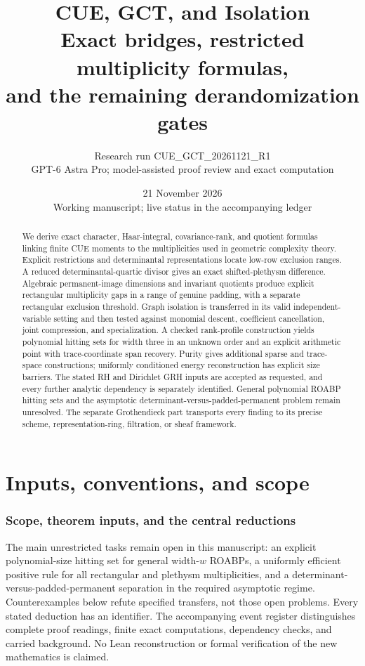 \documentclass[11pt,a4paper]{article}
\title{CUE, GCT, and Isolation\\Exact bridges, restricted multiplicity formulas,\\and the remaining derandomization gates}
\author{Research run CUE\_GCT\_20261121\_R1\\GPT-6 Astra Pro; model-assisted proof review and exact computation}
\date{21 November 2026\\Working manuscript; live status in the accompanying ledger}
\theoremstyle{definition}\newtheorem{definition}{Definition}
\begin{document}
\maketitle
\begin{abstract}
We derive exact character, Haar-integral, covariance-rank, and quotient formulas linking finite CUE moments to the multiplicities used in geometric complexity theory. Explicit restrictions and determinantal representations locate low-row exclusion ranges. A reduced determinantal-quartic divisor gives an exact shifted-plethysm difference. Algebraic permanent-image dimensions and invariant quotients produce explicit rectangular multiplicity gaps in a range of genuine padding, with a separate rectangular exclusion threshold. Graph isolation is transferred in its valid independent-variable setting and then tested against monomial descent, coefficient cancellation, joint compression, and specialization. A checked rank-profile construction yields polynomial hitting sets for width three in an unknown order and an explicit arithmetic point with trace-coordinate span recovery. Purity gives additional sparse and trace-space constructions; uniformly conditioned energy reconstruction has explicit size barriers. The stated RH and Dirichlet GRH inputs are accepted as requested, and every further analytic dependency is separately identified. General polynomial ROABP hitting sets and the asymptotic determinant-versus-padded-permanent problem remain unresolved. The separate Grothendieck part transports every finding to its precise scheme, representation-ring, filtration, or sheaf framework.
\end{abstract}
\tableofcontents\clearpage
\part{Inputs, conventions, and scope}
\section{Scope, theorem inputs, and the central reductions}

The main unrestricted tasks remain open in this manuscript: an explicit polynomial-size hitting set for general width-$w$ ROABPs, a uniformly efficient positive rule for all rectangular and plethysm multiplicities, and a determinant-versus-padded-permanent separation in the required asymptotic regime. Counterexamples below refute specified transfers, not those open problems. Every stated deduction has an identifier. The accompanying event register distinguishes complete proof readings, finite exact computations, dependency checks, and carried background. No Lean reconstruction or formal verification of the new mathematics is claimed.
\end{document}
